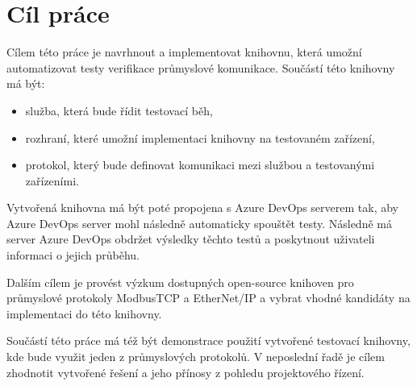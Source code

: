 \chapter{Cíl práce}\label{chap:cil}
Cílem této práce je navrhnout a implementovat knihovnu, která umožní automatizovat testy verifikace průmyslové komunikace. 
Součástí této knihovny má být:
\begin{itemize}
    \item služba, která bude řídit testovací běh,
    \item rozhraní, které umožní implementaci knihovny na testovaném zařízení,
    \item protokol, který bude definovat komunikaci mezi službou a testovanými zařízeními.
\end{itemize}
Vytvořená knihovna má být poté propojena s Azure DevOps serverem tak, aby Azure DevOps server mohl následně automaticky spouštět testy. Následně má server Azure DevOps obdržet výsledky těchto testů a poskytnout uživateli informaci o jejich průběhu. 

Dalším cílem je provést výzkum dostupných open-source knihoven pro průmyslové protokoly ModbusTCP a EtherNet/IP a vybrat vhodné kandidáty na implementaci do této knihovny. 

Součástí této práce má též být demonstrace použití vytvořené testovací knihovny, kde bude využit jeden z průmyslových protokolů. V neposlední řadě je cílem zhodnotit vytvořené řešení a jeho přínosy z pohledu projektového řízení.
